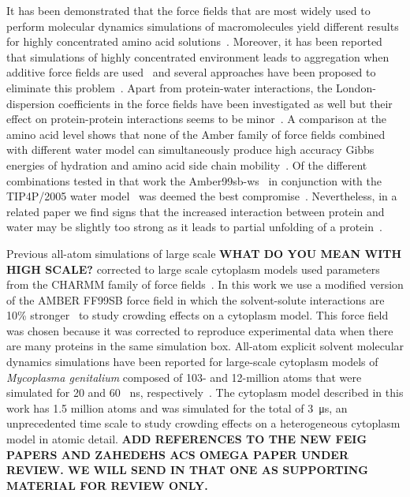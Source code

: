 \documentclass[journal=jcisd8,manuscript=article]{achemso}
\begin{document}
It has been demonstrated that the force fields that are most widely
used to perform molecular dynamics simulations of macromolecules yield
different results for highly concentrated amino acid
solutions~\cite{andrews2013}. Moreover, it has been reported that
simulations of highly concentrated environment leads to aggregation
when additive force fields are used~\cite{Petrov2014a,Abriata2015a,
  Nawrocki2017a} and several approaches have been proposed to
eliminate this
problem~\cite{Best2014a,Piana2015a,Bashardanesh2018b}. Apart from
protein-water interactions, the London-dispersion coefficients in the
force fields have been investigated as well but their effect on
protein-protein interactions seems to be
minor~\cite{Mohebifar2017a,Walters2018a,Bashardanesh2018b}.  A
comparison at the amino acid level shows that none of the Amber family
of force fields combined with different water model can simultaneously
produce high accuracy Gibbs energies of hydration and amino acid side
chain mobility~\cite{HZhang2018a}. Of the different combinations
tested in that work the Amber99sb-ws~\cite{Best2014a} in conjunction
with the TIP4P/2005 water model~\cite{Abascal2005b} was deemed the
best compromise~\cite{HZhang2018a}. Nevertheless, in a related paper
we find signs that the increased interaction between protein and water
may be slightly too strong as it leads to partial unfolding of a
protein~\cite{Bashardanesh2019a}.

Previous
all-atom simulations of {\color{blue} large} scale {\bf WHAT DO YOU MEAN WITH HIGH
  SCALE?} {\color{blue} corrected to large scale} cytoplasm models used parameters from the CHARMM family of
force fields~\cite{Yu2016a}. In this work we use a modified version of
the AMBER FF99SB force field in which the solvent-solute interactions
are 10\% stronger~\cite{Best2014a} to study crowding effects on a
cytoplasm model. This force field was chosen because it was corrected
to reproduce experimental data when there are many proteins in the
same simulation box. All-atom explicit solvent molecular dynamics
simulations have been reported for large-scale cytoplasm models of
\textit{Mycoplasma genitalium} composed of 103- and 12-million atoms
that were simulated for 20 and 60 \SI{}{\nano\second},
respectively~\cite{Yu2016a}. The cytoplasm model described in this
work has 1.5 million atoms and was simulated for the total of
\SI{3}{\micro\second}, an unprecedented time scale to study crowding
effects on a heterogeneous cytoplasm model in atomic detail.  {\bf ADD
  REFERENCES TO THE NEW FEIG PAPERS AND ZAHEDEHS ACS OMEGA PAPER UNDER
  REVIEW. WE WILL SEND IN THAT ONE AS SUPPORTING MATERIAL FOR REVIEW
  ONLY.}
\end{document}
